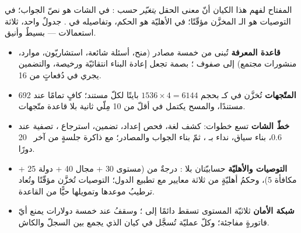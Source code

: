 المفتاح لفهم هذا الكيان أنّ معنى الحقل  \emph{يتغيّر} حسب
: في الشات هو نصّ الجواب؛ في التوصيات هو الـ  المخزَّن مؤقّتًا؛
في الأهليّة هو الحكم، وتفاصيله في . جدولٌ واحد، ثلاثة استعمالات —
بسيطٌ وأنيق.

\begin{summary}
\begin{itemize}
  \item \textbf{قاعدة المعرفة} تُبنى من خمسة مصادر (منح، أسئلة شائعة، استشاريّون،
    موارد، منشورات مجتمع) إلى صفوف ؛ بصمة  تجعل
    إعادة البناء انتقائيّة ورخيصة، والتضمين يجري في دُفعاتٍ من 16.
  \item \textbf{المتّجهات} تُخزَّن في  كـ  بحجم
    $1536 \times 4 = 6144$ بايتًا لكلّ مستند؛ كافٍ تمامًا عند 692 مستندًا، والمسح
    يكتمل في أقلّ من 10 مِلّي ثانية بلا قاعدة متّجهات.
  \item \textbf{خطّ الشات} تسع خطوات: كشف لغة، فحص إعداد، تضمين، استرجاع ،
    تصفية عند 0.6، بناء سياق، نداء  بـ ، ثمّ
    بناء الجواب والمصادر؛ مع ذاكرة جلسةٍ من آخر ~20 دورًا.
  \item \textbf{التوصيات والأهليّة} حسابيّتان بلا : درجةٌ من
    (مستوى 30 + مجال 40 + دولة 25 + مكافأة 5)، وحكمُ أهليّةٍ من ثلاثة معايير مع تطبيع
    الدول؛ التوصيات تُخزَّن مؤقّتًا وتُعاد ترطيبُ موعدها وتمويلها حيًّا من القاعدة.
  \item \textbf{شبكة الأمان} ثلاثيّة المستوى تسقط دائمًا إلى ؛
    وسقفُ  عند خمسة دولارات يمنع أيّ فاتورةٍ مفاجئة؛ وكلّ
    عمليّة تُسجَّل في كيان  الذي يجمع بين السجلّ والكاش.
\end{itemize}
\end{summary}
